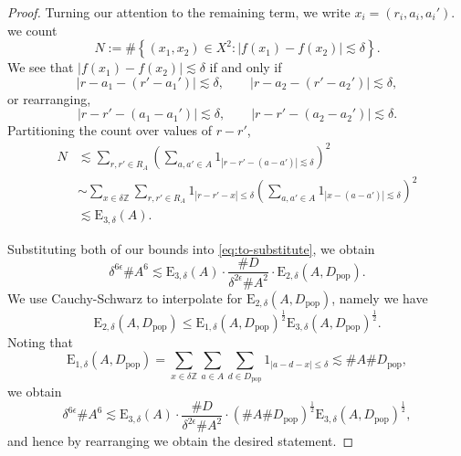 \documentclass[12pt]{amsart}
\newcommand{\pop}{D_{\mathrm{pop}}}
\newcommand{\1}{\mathbf{1}}
\begin{document}
\begin{proof}
Turning our attention to the remaining term, we write  \(x_{i} = (r_{i} ,a_{i} ,a_{i} ')\).
we count
\[
	N := \# \left\{ (x_1,x_2)\in X^{2} : |f(x_1) - f(x_2)| \lesssim \delta \right\} 
.\]
We see that \(\left\lvert f(x_1)-  f(x_2) \right\rvert  \lesssim \delta\) if and only if
\[
	\left\lvert r - a_1 - (r' - a_1' ) \right\rvert  \lesssim \delta, \qquad  \left\lvert r - a_2 - (r' - a_2') \right\rvert \lesssim \delta
,\]
or rearranging,
\[
	\left\lvert r - r' - (a_1 - a_1') \right\rvert  \lesssim \delta, \qquad  \left\lvert r - r' - (a_2 - a_2') \right\rvert \lesssim \delta
.\]
Partitioning the count over values of \(r - r'\),
\begin{align*}
	N & \lesssim \sum _{r,r' \in R_{A} } \left( \sum _{a,a'\in A} 1_{\left\lvert r - r' - (a - a') \right\rvert \lesssim \delta} \right) ^{2} \\
    &\sim  \sum _{x \in \delta \mathbb{Z} } \sum _{r,r' \in R_{A} } 1_{\left\lvert r - r' - x \right\rvert \leq \delta} \left( \sum _{a,a' \in A} 1_{\left\lvert x - (a - a') \right\rvert \lesssim \delta}  \right) ^{2}\\
	& \lesssim \mathrm{E} _{3,\delta} (A).
\end{align*}

Substituting both of our bounds into \eqref{eq:to-substitute}, we obtain
\[
	\delta^{6 \epsilon} \# A ^{6}\lesssim \mathrm{E} _{3, \delta} (A)\cdot \frac{\# D}{\delta^{2 \epsilon}\# A ^{2}} \cdot \mathrm{E} _{2,\delta} (A, D_{\text{pop}} )
.\]
We use Cauchy-Schwarz to interpolate for \(\mathrm{E} _{2,\delta}(A, D_{\text{pop}} ) \), namely we have
\[
	\mathrm{E} _{2,\delta} (A,D_{\text{pop}} )\leq \mathrm{E} _{1,\delta} (A,D_{\text{pop}} )^{\frac{1}{2} } \mathrm{E} _{3,\delta} (A,D_{\text{pop}} ) ^{\frac{1}{2} }
.\]
Noting that
\[
	\mathrm{E} _{1,\delta}(A,D_{\text{pop}} ) = \sum _{x \in \delta \mathbb{Z} } \sum _{a \in A} \sum _{d \in D _{ \text{pop} } } 1_{\left\lvert a - d - x \right\rvert \leq \delta} 	\lesssim \# A \# \pop 	
,\]
we obtain
\[
	\delta^{6 \epsilon} \# A ^{6}\lesssim \mathrm{E} _{3, \delta} (A)\cdot \frac{\# D}{\delta^{2 \epsilon}\# A ^{2}} \cdot \left( \# A \# \pop  \right) ^{\frac{1}{2} } \mathrm{E} _{3,\delta} (A, \pop )	^{\frac{1}{2} }	
,\]
and hence by rearranging we obtain the desired statement.
\end{proof}
\end{document}
